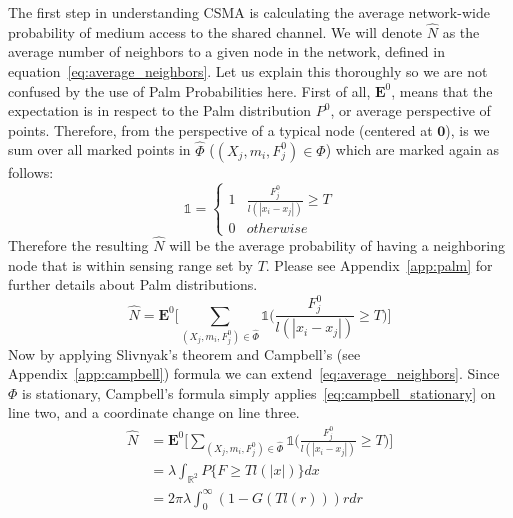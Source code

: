 \par
%
The first step in understanding CSMA is calculating the average network-wide probability of medium access to the shared channel.  We will denote $\hat{N}$ as the average number of neighbors to a given node in the network, defined in equation~\eqref{eq:average_neighbors}.  Let us explain this thoroughly so we are not confused by the use of Palm Probabilities here.  First of all, $\textbf{E}^0$, means that the expectation is in respect to the Palm distribution $P^0$, or average perspective of points. Therefore, from the perspective of a typical node (centered at $\textbf{0}$), is we sum over all marked points in $\hat{\Phi}$ ($(X_j,m_i,F^0_j) \in \Phi$) which are marked again as follows:
\begin{equation}
\mathbb{1} = \begin{cases}
      1 & \frac{F_j^0}{l(|x_i-x_j|)} \geq T \\
			0 & otherwise
   \end{cases}
\end{equation}
%
Therefore the resulting $\hat{N}$ will be the average probability of having a neighboring node that is within sensing range set by $T$.  Please see Appendix~\ref{app:palm} for further details about Palm distributions.
%
\begin{equation}\label{eq:average_neighbors}
	\hat{N} = \textbf{E}^0\Bigg[ \sum_{(X_j,m_i,F^0_j) \in \hat{\Phi}} \mathbb{1}\Big(\frac{F_j^0}{l(|x_i-x_j|)} \geq T\Big) \Bigg]
\end{equation}
%
Now by applying Slivnyak’s theorem and Campbell’s (see Appendix~\ref{app:campbell}) formula we can extend~\eqref{eq:average_neighbors}.  Since $\Phi$ is stationary, Campbell’s formula simply applies~\eqref{eq:campbell_stationary} on line two, and a coordinate change on line three.
%
\begin{equation}\label{eq:average_neighbors}
	\begin{split}
	\hat{N} &= \textbf{E}^0\Bigg[ \sum_{(X_j,m_i,F^0_j) \in \hat{\Phi}} \mathbb{1}\Big(\frac{F_j^0}{l(|x_i-x_j|)} \geq T\Big) \Bigg] \\
	&= \lambda \int_{\mathbb{R}^2} P\{ F \geq T l(|x|) \} dx \\
	&= 2 \pi \lambda \int_{0}^{\infty} (1 - G(T l(r) ) )r dr
\end{split}
\end{equation}
